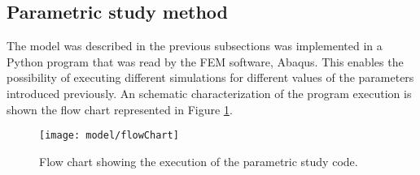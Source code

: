   \clearpage
  \subsection{Parametric study method} \label{subsec:parametricStudy_computationalModel}

    The model was described in the previous subsections was implemented in a Python program that was read by the FEM software, Abaqus. This enables the possibility of executing different simulations for different values of the parameters introduced previously. An schematic characterization of the program execution is shown the flow chart represented in Figure \ref{fig:flowChart}.

    \begin{figure}[!htpb]
      \centering
      \texttt{[image: model/flowChart]}
      \caption[Flow chart showing the execution of the parametric study code]{Flow chart showing the execution of the parametric study code. }\label{fig:flowChart}
    \end{figure}
